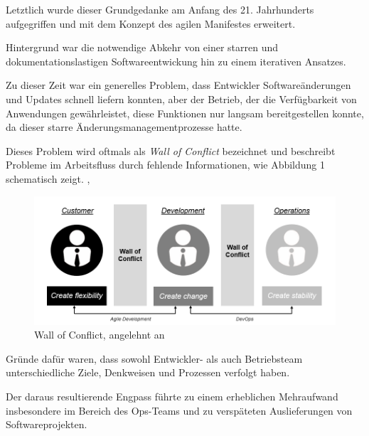 Letztlich wurde dieser Grundgedanke am Anfang des 21. Jahrhunderts aufgegriffen und mit dem Konzept des agilen Manifestes erweitert.

Hintergrund war die notwendige Abkehr von einer starren und dokumentationslastigen Softwareentwickung hin zu einem iterativen Ansatzes. \cite[S.4]{sharma_devops_2017}

Zu dieser Zeit war ein generelles Problem, dass Entwickler Softwareänderungen und Updates schnell liefern konnten, aber der Betrieb, der die Verfügbarkeit von Anwendungen gewährleistet, diese Funktionen nur langsam bereitgestellen konnte, da dieser starre Änderungsmanagementprozesse hatte.

Dieses Problem wird oftmals als \textit{Wall of Conflict} bezeichnet und beschreibt Probleme im Arbeitsfluss durch fehlende Informationen, wie Abbildung 1 schematisch zeigt. \cite{kawaguchi_wall_2020}, \cite[S. 26]{huttermann_devops_2012} 

\begin{figure}[h]
    \centering
    \includegraphics[scale=0.6]{Bilder/Wall of Conflict.png}
    \caption{Wall of Conflict, angelehnt an \cite{hering_devops_2018}}
\end{figure}

Gründe dafür waren, dass sowohl Entwickler- als auch Betriebsteam unterschiedliche Ziele, Denkweisen und Prozessen verfolgt haben. \cite{wettinger_streamlining_2016} 

Der daraus resultierende Engpass führte zu einem erheblichen Mehraufwand insbesondere im Bereich des Ops-Teams und zu verspäteten Auslieferungen von Softwareprojekten.

